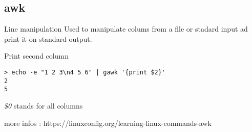 \subsection{awk}

\begin{frame}[fragile]{Line manipulation}
Used to manipulate colums from a file or stadard input ad print it on standard output.
  \pause
  \begin{exampleblock}{Print second column}
    \begin{lstlisting}[showstringspaces=false]
> echo -e "1 2 3\n4 5 6" | gawk '{print $2}'
2
5
    \end{lstlisting}
  \end{exampleblock}
\pause
\emph{\$0} stands for all columns
\pause

more infos : https://linuxconfig.org/learning-linux-commands-awk
\end{frame}

